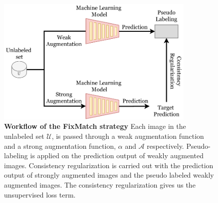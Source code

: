 \begin{figure}[htbp]
\centering
\captionsetup{format=plain}
\includegraphics[keepaspectratio,width=0.85\textwidth]{figures/fig_fixmatch.pdf}
\caption[Workflow of the FixMatch strategy]{\textbf{Workflow of the FixMatch strategy} Each image in the unlabeled set $\mathcal{U}$, is passed through a weak augmentation function and a strong augmentation function, $\alpha$ and $\mathcal{A}$ respectively. Pseudo-labeling is applied on the prediction output of weakly augmented images. Consistency regularization is carried out with the prediction output of strongly augmented images and the pseudo labeled weakly augmented images. The consistency regularization gives us the unsupervised loss term.}
\label{fig:fixmatch}
\end{figure}
